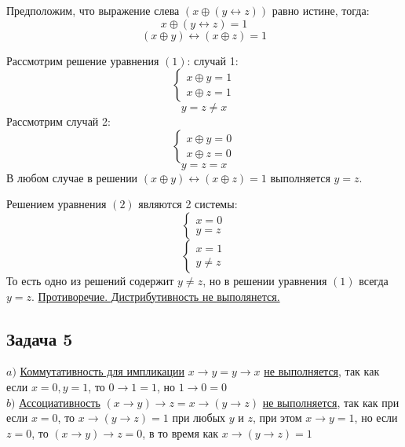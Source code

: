 \documentclass[a4paper,12pt]{article} %
\begin{document}
Предположим, что выражение слева $(x\oplus (y \leftrightarrow z))$ равно истине, тогда:
\begin{equation}x\oplus (y \leftrightarrow z)=1
\end{equation}
\begin{equation}(x\oplus y)\leftrightarrow (x\oplus z)=1
\end{equation}

Рассмотрим решение уравнения $(1)$: случай 1:
\[\begin{cases}
  x\oplus y = 1\\
  x\oplus z = 1
\end{cases}\]
\[y=z\neq x\]
Рассмотрим случай 2:
\[\begin{cases}
  x\oplus y = 0\\
  x\oplus z = 0
\end{cases}\]
\[y=z = x\]
В любом случае в решении $(x\oplus y)\leftrightarrow (x\oplus z)=1$ выполняется $y=z$.
  
Решением уравнения $(2)$ являются 2 системы:
 \begin{equation}\begin{cases}
  x = 0\\
  y =z
\end{cases} \end{equation}
 \begin{equation}\begin{cases}
  x = 1\\
  y \neq z
\end{cases} \end{equation}
 То есть одно из решений содержит $y \neq z$, но в решении уравнения $(1)$ всегда $y=z$.
\underline{Противоречие. Дистрибутивность не выполянется.}
\newpage
\begin{center}
\section*{Задача 5}
\end{center}

$a)$ \underline{Коммутативность для импликации} $x\rightarrow y =y\rightarrow x$ \underline{не выполняется}, так как если $x=0, y=1$, то $0\rightarrow 1=1$, но $1\rightarrow 0=0$ \\

$b)$ \underline{Ассоциативность} $(x\rightarrow y)\rightarrow z = x\rightarrow (y\rightarrow z) $ \underline{не выполняется}, так как при если $x=0$, то $x\rightarrow (y\rightarrow z)=1$ при любых $y$ и $z$, при этом $x\rightarrow y=1$, но если $z=0$, то $(x\rightarrow y)\rightarrow z =0$, в то время как $x\rightarrow (y\rightarrow z)=1$ \\
\end{document}
